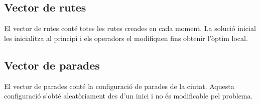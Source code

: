 \subsection{Vector de rutes} %

El vector de rutes conté totes les rutes creades en cada moment. La solució inicial les inicialitza al principi i els operadors el modifiquen fins obtenir l'òptim local.

\subsection{Vector de parades} %

El vector de parades conté la configuració de parades de la ciutat. Aquesta configuració s'obté aleatòriament des d'un inici i no és modificable pel problema.

